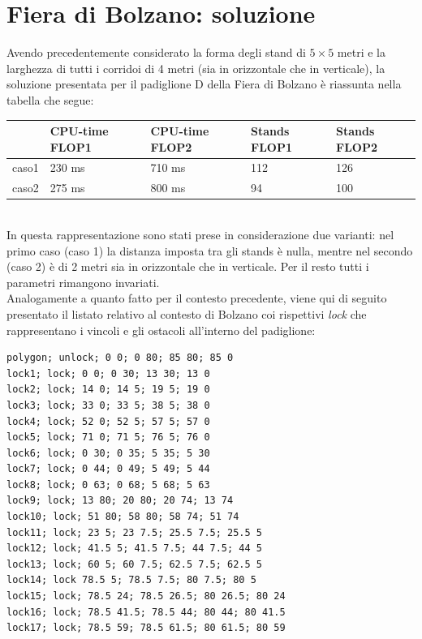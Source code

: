 \documentclass[12pt,a4paper,openright,twoside]{report}
\begin{document}
\section{Fiera di Bolzano: soluzione}
Avendo precedentemente considerato la forma degli stand di $5 \times 5$ metri e la larghezza di tutti i corridoi di 4 metri (sia in orizzontale che in verticale), la soluzione presentata per il padiglione D della Fiera di Bolzano \`{e} riassunta nella tabella che segue:
\begin{table}[!h]
\begin{center}
\begin{tabular}{|l|l|l|l|l|}
\hline
& CPU-time FLOP1 & CPU-time FLOP2 & Stands FLOP1 & Stands FLOP2 \\
\hline
caso1& 230 ms & 710 ms & 112 & 126 \\
\hline
caso2& 275 ms & 800 ms & 94 & 100 \\
\hline
\end{tabular}
\end{center}
\end{table}
\\In questa rappresentazione sono stati prese in considerazione due varianti: nel primo caso (caso 1) la distanza imposta tra gli stands \`{e} nulla, mentre nel secondo (caso 2) \`{e} di 2 metri sia in orizzontale che in verticale. Per il resto tutti i parametri rimangono invariati.\\ 
Analogamente a quanto fatto per il contesto precedente, viene qui di seguito presentato il listato relativo al contesto di Bolzano coi rispettivi \textit{lock} che rappresentano i vincoli e gli ostacoli all'interno del padiglione:
\begin{verbatim}
polygon; unlock; 0 0; 0 80; 85 80; 85 0				
lock1; lock; 0 0; 0 30; 13 30; 13 0
lock2; lock; 14 0; 14 5; 19 5; 19 0
lock3; lock; 33 0; 33 5; 38 5; 38 0
lock4; lock; 52 0; 52 5; 57 5; 57 0
lock5; lock; 71 0; 71 5; 76 5; 76 0
lock6; lock; 0 30; 0 35; 5 35; 5 30
lock7; lock; 0 44; 0 49; 5 49; 5 44
lock8; lock; 0 63; 0 68; 5 68; 5 63
lock9; lock; 13 80; 20 80; 20 74; 13 74
lock10; lock; 51 80; 58 80; 58 74; 51 74
lock11; lock; 23 5; 23 7.5; 25.5 7.5; 25.5 5
lock12; lock; 41.5 5; 41.5 7.5; 44 7.5; 44 5
lock13; lock; 60 5; 60 7.5; 62.5 7.5; 62.5 5
lock14; lock 78.5 5; 78.5 7.5; 80 7.5; 80 5
lock15; lock; 78.5 24; 78.5 26.5; 80 26.5; 80 24
lock16; lock; 78.5 41.5; 78.5 44; 80 44; 80 41.5
lock17; lock; 78.5 59; 78.5 61.5; 80 61.5; 80 59
\end{verbatim}
\end{document}
